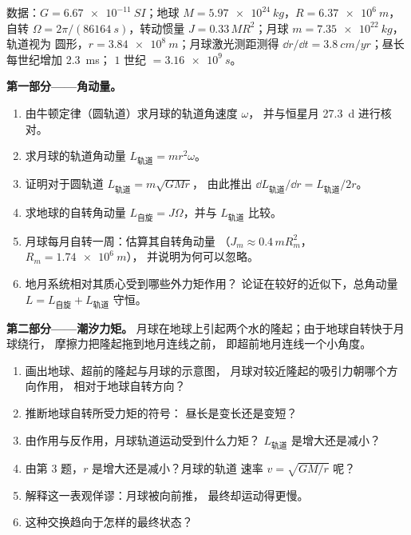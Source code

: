 \begin{problem}
\label{pb:b1:angular-momentum:1}
数据：$G = \qty{6.67e-11}{SI}$；地球 $M = \qty{5.97e24}{kg}$，$R =
\qty{6.37e6}{m}$，自转 $\Omega = 2\pi/(\qty{86164}{s})$，转动惯量
$J = 0.33\,MR^2$；月球 $m = \qty{7.35e22}{kg}$，轨道视为
圆形，$r = \qty{3.84e8}{m}$；月球激光测距测得
$\dd r/\dd t = \qty{3.8}{cm/yr}$；昼长每世纪增加 \qty{2.3}{ms}；
$1$ 世纪 $= \qty{3.16e9}{s}$。

\medskip
\noindent\textbf{第一部分——角动量。}
\begin{enumerate}
  \item 由牛顿定律（圆轨道）求月球的轨道角速度 $\omega$，
        并与恒星月
        \qty{27.3}{d} 进行核对。
  \item 求月球的轨道角动量 $L_{\text{轨道}} =
        mr^2\omega$。
  \item 证明对于圆轨道 $L_{\text{轨道}} = m\sqrt{GMr}$，
        由此推出 $\dd L_{\text{轨道}}/\dd r = L_{\text{轨道}}/2r$。
  \item 求地球的自转角动量 $L_{\text{自旋}} =
        J\Omega$，并与 $L_{\text{轨道}}$ 比较。
  \item 月球每月自转一周：估算其自转角动量
        （$J_m \approx 0.4\,mR_m^2$，$R_m = \qty{1.74e6}{m}$），
        并说明为何可以忽略。
  \item 地月系统相对其质心受到哪些外力矩作用？
        论证在较好的近似下，总角动量
        $L = L_{\text{自旋}} + L_{\text{轨道}}$ 守恒。
\end{enumerate}

\medskip
\noindent\textbf{第二部分——潮汐力矩。}
月球在地球上引起两个水的隆起；由于地球自转快于月球绕行，
摩擦力把隆起拖到地月连线之前，
即超前地月连线一个小角度。
\begin{enumerate}[resume]
  \item 画出地球、超前的隆起与月球的示意图，
        月球对较近隆起的吸引力朝哪个方向作用，
        相对于地球自转方向？
  \item 推断地球自转所受力矩的符号：
        昼长是变长还是变短？
  \item 由作用与反作用，月球轨道运动受到什么力矩？
        $L_{\text{轨道}}$ 是增大还是减小？
  \item 由第 3 题，$r$ 是增大还是减小？月球的轨道
        速率 $v = \sqrt{GM/r}$ 呢？
  \item 解释这一表观佯谬：月球被向前推，
        最终却运动得更慢。
  \item 这种交换趋向于怎样的最终状态？
\end{enumerate}


\end{problem}

